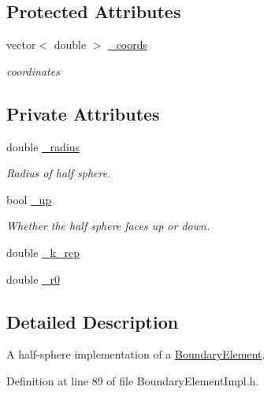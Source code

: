 \subsection*{Protected Attributes}
\begin{DoxyCompactItemize}
\item 
vector$<$ double $>$ \hyperlink{classBoundaryElement_ab51302e10e3e2def98438234ba5bf801}{\+\_\+coords}
\begin{DoxyCompactList}\small\item\em coordinates \end{DoxyCompactList}\end{DoxyCompactItemize}
\subsection*{Private Attributes}
\begin{DoxyCompactItemize}
\item 
double \hyperlink{classHalfSphereZBoundaryElement_ad1fff310ac2c3f221a8ab7393dc23b69}{\+\_\+radius}
\begin{DoxyCompactList}\small\item\em Radius of half sphere. \end{DoxyCompactList}\item 
bool \hyperlink{classHalfSphereZBoundaryElement_a3251d9e34c161076f9324dc3f2477720}{\+\_\+up}
\begin{DoxyCompactList}\small\item\em Whether the half sphere faces up or down. \end{DoxyCompactList}\item 
double \hyperlink{classHalfSphereZBoundaryElement_aaafd14a29987646f9537a7248ba6291b}{\+\_\+k\+\_\+rep}
\item 
double \hyperlink{classHalfSphereZBoundaryElement_afa790cdbea557aa8615188211acaedce}{\+\_\+r0}
\end{DoxyCompactItemize}


\subsection{Detailed Description}
A half-\/sphere implementation of a \hyperlink{classBoundaryElement}{Boundary\+Element}. 

Definition at line 89 of file Boundary\+Element\+Impl.\+h.




